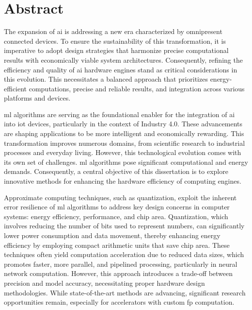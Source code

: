 \chapter*{Abstract}
\thispagestyle{empty}

The expansion of \gls{ai} is addressing a new era characterized by omnipresent connected devices. To ensure the sustainability of this transformation, it is imperative to adopt design strategies that harmonize precise computational results with economically viable system architectures. Consequently, refining the efficiency and quality of \gls{ai} hardware engines stand as critical considerations in this evolution. This necessitates a balanced approach that prioritizes energy-efficient computations, precise and reliable results, and integration across various platforms and devices.

\gls{ml} algorithms are serving as the foundational enabler for the integration of \gls{ai} into \gls{iot} devices, particularly in the context of Industry 4.0. These advancements are shaping applications to be more intelligent and economically rewarding. This transformation improves numerous domains, from scientific research to industrial processes and everyday living. However, this technological evolution comes with its own set of challenges. \gls{ml} algorithms pose significant computational and energy demands. Consequently, a central objective of this dissertation is to explore innovative methods for enhancing the hardware efficiency of computing engines.

Approximate computing techniques, such as quantization, exploit the inherent error resilience of \gls{ml} algorithms to address key design concerns in computer systems: energy efficiency, performance, and chip area. Quantization, which involves reducing the number of bits used to represent numbers, can significantly lower power consumption and data movement, thereby enhancing energy efficiency by employing compact arithmetic units that save chip area. These techniques often yield computation acceleration due to reduced data sizes, which promotes faster, more parallel, and pipelined processing, particularly in neural network computation. However, this approach introduces a trade-off between precision and model accuracy, necessitating proper hardware design methodologies. While state-of-the-art methods are advancing, significant research opportunities remain, especially for accelerators with custom \gls{fp} computation.

